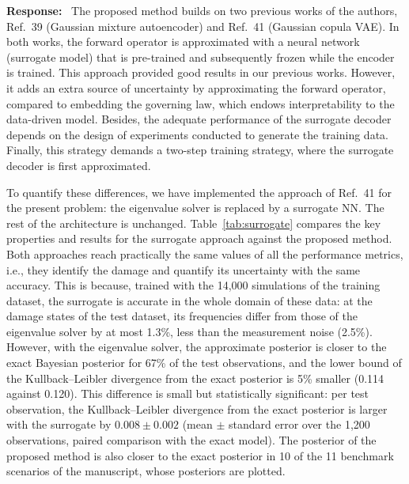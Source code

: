 \documentclass[11pt]{article}
\newenvironment{response}{\par\smallskip\noindent\color{resp}\textbf{Response:}\ }{\par}
\begin{document}
\begin{response}
	The proposed method builds on two previous works of the authors, Ref.~39 (Gaussian mixture autoencoder) and Ref.~41 (Gaussian copula VAE).
	In both works, the forward operator is approximated with a neural network (surrogate model) that is pre-trained and subsequently frozen while the encoder is trained.
	This approach provided good results in our previous works.
	However, it adds an extra source of uncertainty by approximating the forward operator, compared to embedding the governing law, which endows interpretability to the data-driven model. 
	Besides, the adequate performance of the surrogate decoder depends on the design of experiments conducted to generate the training data.
	Finally, this strategy demands a two-step training strategy, where the surrogate decoder is first approximated. 
	
	To quantify these differences, we have implemented the approach of Ref.~41 for the present problem: the eigenvalue solver is replaced by a surrogate NN. The rest of the architecture is unchanged.
	Table~\ref{tab:surrogate} compares the key properties and results for the surrogate approach against the proposed method.
	Both approaches reach practically the same values of all the performance metrics, i.e., they identify the damage and quantify its uncertainty with the same accuracy. This is because, trained with the 14,000 simulations of the training dataset, the surrogate is accurate in the whole domain of these data: at the damage states of the test dataset, its frequencies differ from those of the eigenvalue solver by at most 1.3\%, less than the measurement noise (2.5\%).
	However, with the eigenvalue solver, the approximate posterior is closer to the exact Bayesian posterior for 67\% of the test observations, and the lower bound of the Kullback--Leibler divergence from the exact posterior is 5\% smaller (0.114 against 0.120).
	This difference is small but statistically significant: per test observation, the Kullback--Leibler divergence from the exact posterior is larger with the surrogate by $0.008\pm0.002$ (mean $\pm$ standard error over the 1,200 observations, paired comparison with the exact model). The posterior of the proposed method is also closer to the exact posterior in 10 of the 11 benchmark scenarios of the manuscript, whose posteriors are plotted.


\end{response}
\end{document}

